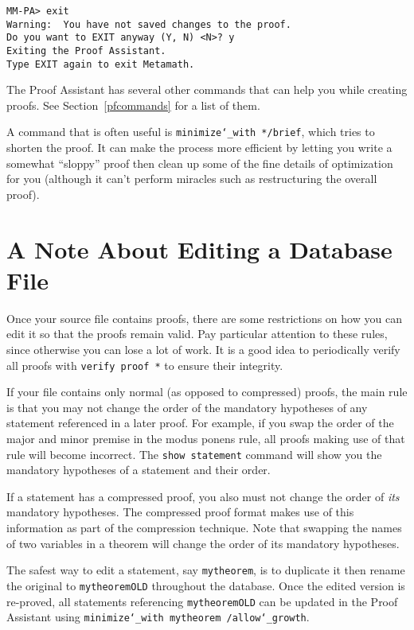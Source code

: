 \begin{verbatim}
MM-PA> exit
Warning:  You have not saved changes to the proof.
Do you want to EXIT anyway (Y, N) <N>? y
Exiting the Proof Assistant.
Type EXIT again to exit Metamath.
\end{verbatim}

The Proof Assistant has several other commands
that can help you while creating proofs.  See Section~\ref{pfcommands}
for a list of them.

A command that is often useful is \texttt{minimize{\char`\_}with
*/brief}, which tries to shorten the proof.  It can make the process
more efficient by letting you write a somewhat ``sloppy'' proof then
clean up some of the fine details of optimization for you (although it
can't perform miracles such as restructuring the overall proof).

\section{A Note About Editing a Data\-base File}

Once your source file contains proofs, there are some restrictions on
how you can edit it so that the proofs remain valid.  Pay particular
attention to these rules, since otherwise you can lose a lot of work.
It is a good idea to periodically verify all proofs with \texttt{verify
proof *} to ensure their integrity.

If your file contains only normal (as opposed to compressed) proofs, the
main rule is that you may not change the order of the mandatory
hypotheses of any statement referenced in a
later proof.  For example, if you swap the order of the major and minor
premise in the modus ponens rule, all proofs making use of that rule
will become incorrect.  The \texttt{show statement}
command will show you the
mandatory hypotheses of a statement and their order.

If a statement has a compressed proof, you also must not change the
order of {\em its} mandatory hypotheses.  The compressed proof format
makes use of this information as part of the compression technique.
Note that swapping the names of two variables in a theorem will change
the order of its mandatory hypotheses.

The safest way to edit a statement, say \texttt{mytheorem}, is to
duplicate it then rename the original to \texttt{mytheoremOLD}
throughout the database.  Once the edited version is re-proved, all
statements referencing \texttt{mytheoremOLD} can be updated in the Proof
Assistant using \texttt{minimize{\char`\_}with
mytheorem
/allow{\char`\_}growth}.


